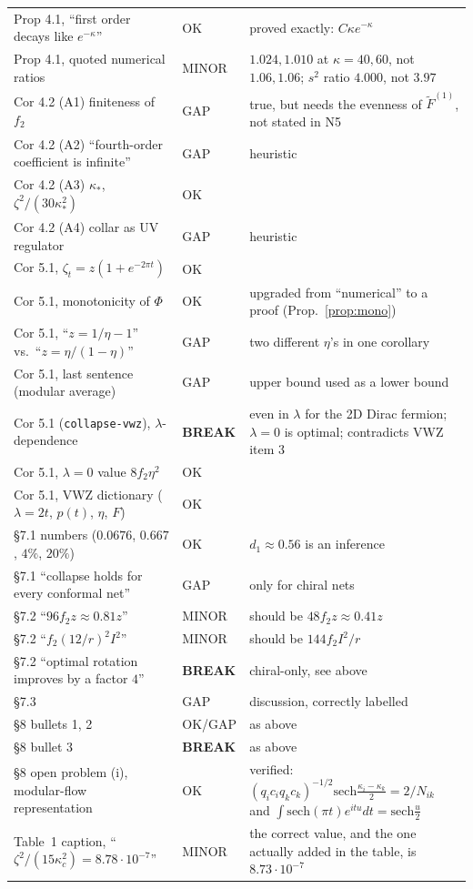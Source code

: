 \documentclass[11pt]{article}
\begin{document}
\begin{longtable}{@{}p{}p{}p{}@{}}
Prop 4.1, ``first order decays like $e^{-\kappa}$'' & OK & proved exactly: $C\kappa e^{-\kappa}$\\
Prop 4.1, quoted numerical ratios & MINOR & $1.024,1.010$ at $\kappa=40,60$, not $1.06,1.06$;
$s^2$ ratio $4.000$, not $3.97$\\
Cor 4.2 (A1) finiteness of $f_2$ & GAP & true, but needs the evenness of $\widetilde F^{(1)}$,
not stated in N5\\
Cor 4.2 (A2) ``fourth-order coefficient is infinite'' & GAP & heuristic\\
Cor 4.2 (A3) $\kappa_*$, $\zeta^2/(30\kappa_*^2)$ & OK & \\
Cor 4.2 (A4) collar as UV regulator & GAP & heuristic\\
Cor 5.1, $\zeta_t=z(1+e^{-2\pi t})$ & OK & \\
Cor 5.1, monotonicity of $\Phi$ & OK & upgraded from ``numerical'' to a proof
(Prop.~\ref{prop:mono})\\
Cor 5.1, ``$z=1/\eta-1$'' vs.\ ``$z=\eta/(1-\eta)$'' & GAP & two different $\eta$'s in one corollary\\
Cor 5.1, last sentence (modular average) & GAP & upper bound used as a lower bound\\
Cor 5.1 (\texttt{collapse-vwz}), $\lambda$-dependence & \textbf{BREAK} & even in $\lambda$ for the
2D Dirac fermion; $\lambda=0$ is optimal; contradicts VWZ item 3\\
Cor 5.1, $\lambda=0$ value $8f_2\eta^2$ & OK & \\
Cor 5.1, VWZ dictionary ($\lambda=2t$, $p(t)$, $\eta$, $F$) & OK & \\
\S7.1 numbers ($0.0676$, $0.667$, $4\%$, $20\%$) & OK & $d_1\approx0.56$ is an inference\\
\S7.1 ``collapse holds for every conformal net'' & GAP & only for chiral nets\\
\S7.2 ``$96f_2z\approx0.81z$'' & MINOR & should be $48f_2z\approx0.41z$\\
\S7.2 ``$f_2(12/r)^2I^2$'' & MINOR & should be $144f_2I^2/r$\\
\S7.2 ``optimal rotation improves by a factor $4$'' & \textbf{BREAK} & chiral-only, see above\\
\S7.3 & GAP & discussion, correctly labelled\\
\S8 bullets 1, 2 & OK/GAP & as above\\
\S8 bullet 3 & \textbf{BREAK} & as above\\
\S8 open problem (i), modular-flow representation & OK & verified:
$(q_ic_iq_kc_k)^{-1/2}\mathrm{sech}\frac{\kappa_i-\kappa_k}2=2/N_{ik}$ and
$\int\mathrm{sech}(\pi t)e^{itu}dt=\mathrm{sech}\frac u2$\\
Table~1 caption, ``$\zeta^2/(15\kappa_c^2)=8.78\cdot10^{-7}$'' & MINOR & the correct value, and the
one actually added in the table, is $8.73\cdot10^{-7}$\\
\bottomrule
\end{longtable}
\end{document}
